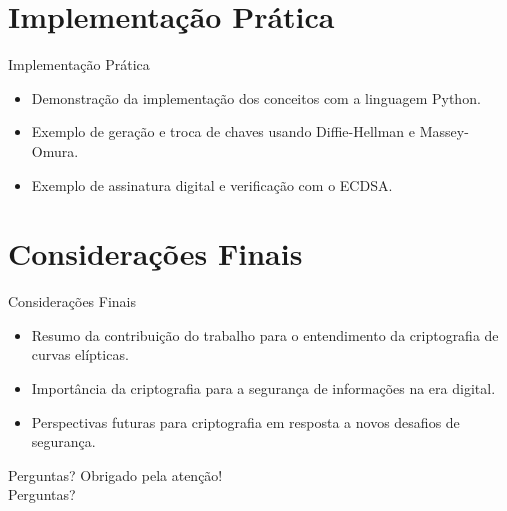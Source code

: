 \documentclass[brazil]{beamer}
\begin{document}
\section{Implementação Prática}
\begin{frame}
	\tableofcontents[currentsection]
\end{frame}
\begin{frame}{Implementação Prática}
	\justifying
	\begin{itemize}[label={$\bullet$}]
		\item Demonstração da implementação dos conceitos com a linguagem Python.
		\item Exemplo de geração e troca de chaves usando Diffie-Hellman e Massey-Omura.
		\item Exemplo de assinatura digital e verificação com o ECDSA.
	\end{itemize}
\end{frame}

\section{Considerações Finais}
\begin{frame}
	\tableofcontents[currentsection]
\end{frame}
\begin{frame}{Considerações Finais}
	\justifying
	\begin{itemize}[label={$\bullet$}]
		\item Resumo da contribuição do trabalho para o entendimento da criptografia de curvas elípticas.
		\item Importância da criptografia para a segurança de informações na era digital.
		\item Perspectivas futuras para criptografia em resposta a novos desafios de segurança.
	\end{itemize}
\end{frame}

\begin{frame}{Perguntas?}
	\centering
	\Large
	Obrigado pela atenção!\\
	Perguntas?
\end{frame}
\end{document}
